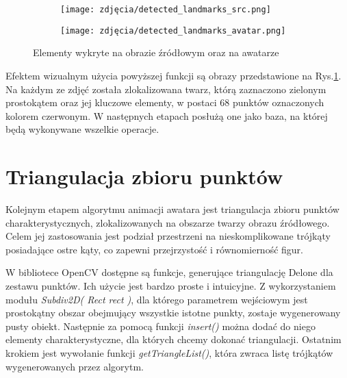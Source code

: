 \begin{figure}[h]
	\centering
	\begin{subfigure}{0.35\textwidth}
		\centering
		\texttt{[image: zdjęcia/detected\_landmarks\_src.png]}
		\subcaption{\label{detected_landmarks_src}}
	\end{subfigure}
	\begin{subfigure}{0.35\textwidth}
		\centering
		\texttt{[image: zdjęcia/detected\_landmarks\_avatar.png]}
		\subcaption{\label{detected_landmarks_avatar}}
	\end{subfigure}
	
	\caption{\label{fig:detectedLandmarks}Elementy wykryte na obrazie źródłowym \protect{} \cite{data} oraz na awatarze \protect{} \cite{avatars}}
\end{figure}

Efektem wizualnym użycia powyższej funkcji są obrazy przedstawione na Rys.\ref{fig:detectedLandmarks}. Na każdym ze zdjęć została zlokalizowana twarz, którą zaznaczono zielonym prostokątem oraz jej kluczowe elementy, w postaci 68 punktów oznaczonych kolorem czerwonym. W następnych etapach posłużą one jako baza, na której będą wykonywane wszelkie operacje. 



\section{Triangulacja zbioru punktów}
Kolejnym etapem algorytmu animacji awatara jest triangulacja zbioru punktów charakterystycznych, zlokalizowanych na obszarze twarzy obrazu źródłowego. Celem jej zastosowania jest podział przestrzeni na nieskomplikowane trójkąty posiadające ostre kąty, co zapewni przejrzystość i równomierność figur.

W bibliotece OpenCV dostępne są funkcje, generujące triangulację Delone dla zestawu punktów. Ich użycie jest bardzo proste i intuicyjne. Z wykorzystaniem modułu \textit{Subdiv2D( Rect rect )}, dla którego parametrem wejściowym jest prostokątny obszar obejmujący wszystkie istotne punkty, zostaje wygenerowany pusty obiekt. Następnie za pomocą funkcji \textit{insert()} można dodać do niego elementy charakterystyczne, dla których chcemy dokonać triangulacji. Ostatnim krokiem jest wywołanie funkcji \textit{getTriangleList()}, która zwraca listę trójkątów wygenerowanych przez algorytm. 

